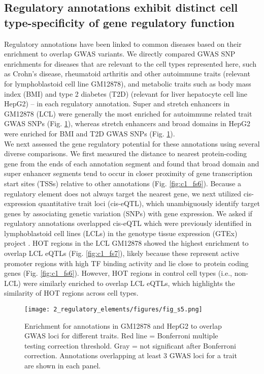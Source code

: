 \subsection{Regulatory annotations exhibit distinct cell type-specificity of gene regulatory function}
Regulatory annotations have been linked to common diseases based on their enrichment to overlap GWAS variants. We directly compared GWAS SNP enrichments for diseases that are relevant to the cell types represented here, such as Crohn’s disease, rheumatoid arthritis and other autoimmune traits (relevant for lymphoblastoid cell line GM12878), and metabolic traits such as body mass index (BMI) and type 2 diabetes (T2D) (relevant for liver hepatocyte cell line HepG2) – in each regulatory annotation. Super and stretch enhancers in GM12878 (LCL) were generally the most enriched for autoimmune related trait GWAS SNPs (Fig. \ref{fig:c1_fs5}), whereas stretch enhancers and broad domains in HepG2 were enriched for BMI and T2D GWAS SNPs (Fig. \ref{fig:c1_fs5}). \\
We next assessed the gene regulatory potential for these annotations using several diverse comparisons. We first measured the distance to nearest protein-coding gene from the ends of each annotation segment and found that broad domain and super enhancer segments tend to occur in closer proximity of gene transcription start sites (TSSs) relative to other annotations (Fig. \ref{fig:c1_fs6}). Because a regulatory element does not always target the nearest gene, we next utilized cis-expression quantitative trait loci (cis-eQTL), which unambiguously identify target genes by associating genetic variation (SNPs) with gene expression. We asked if regulatory annotations overlapped cis-eQTL which were previously identified in lymphoblastoid cell lines (LCLs) in the genotype tissue expression (GTEx) project \cite{gtexconsortiumGeneticEffectsGene2017}. HOT regions in the LCL GM12878 showed the highest enrichment to overlap LCL eQTLs (Fig. \ref{fig:c1_fs7}), likely because these represent active promoter regions with high TF binding activity and lie close to protein coding genes (Fig. \ref{fig:c1_fs6}). However, HOT regions in control cell types (i.e., non-LCL) were similarly enriched to overlap LCL eQTLs, which highlights the similarity of HOT regions across cell types. \\

\begin{figure}
    \centering
    \texttt{[image: 2\_regulatory\_elements/figures/fig\_s5.png]}
    \caption{Enrichment for annotations in GM12878 and HepG2 to overlap GWAS loci for different traits. Red line = Bonferroni multiple testing correction threshold. Gray = not significant after Bonferroni correction. Annotations overlapping at least 3 GWAS loci for a trait are shown in each panel.}
    \label{fig:c1_fs5}
\end{figure}

